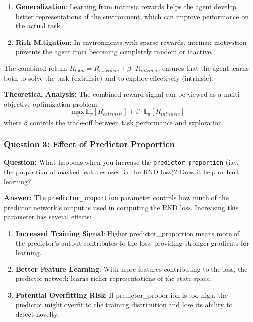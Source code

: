 \documentclass[12pt]{article}
\begin{document}
{{{\begin{enumerate}
    \item \textbf{Generalization}: Learning from intrinsic rewards helps the agent develop better representations of the environment, which can improve performance on the actual task.
    
    \item \textbf{Risk Mitigation}: In environments with sparse rewards, intrinsic motivation prevents the agent from becoming completely random or inactive.
\end{enumerate}

The combined return $R_{total} = R_{extrinsic} + \beta \cdot R_{intrinsic}$ ensures that the agent learns both to solve the task (extrinsic) and to explore effectively (intrinsic).

\textbf{Theoretical Analysis:} The combined reward signal can be viewed as a multi-objective optimization problem:
\begin{equation}
\max_{\pi} \mathbb{E}_{\pi}[R_{extrinsic}] + \beta \cdot \mathbb{E}_{\pi}[R_{intrinsic}]
\end{equation}
where $\beta$ controls the trade-off between task performance and exploration.

\subsubsection{Question 3: Effect of Predictor Proportion}

\textbf{Question:} What happens when you increase the \texttt{predictor\_proportion} (i.e., the proportion of masked features used in the RND loss)? Does it help or hurt learning?

\textbf{Answer:} The \texttt{predictor\_proportion} parameter controls how much of the predictor network's output is used in computing the RND loss. Increasing this parameter has several effects:

\begin{enumerate}
    \item \textbf{Increased Training Signal}: Higher predictor\_proportion means more of the predictor's output contributes to the loss, providing stronger gradients for learning.
    
    \item \textbf{Better Feature Learning}: With more features contributing to the loss, the predictor network learns richer representations of the state space.
    
    \item \textbf{Potential Overfitting Risk}: If predictor\_proportion is too high, the predictor might overfit to the training distribution and lose its ability to detect novelty.
    

\end{enumerate}}}}
\end{document}
